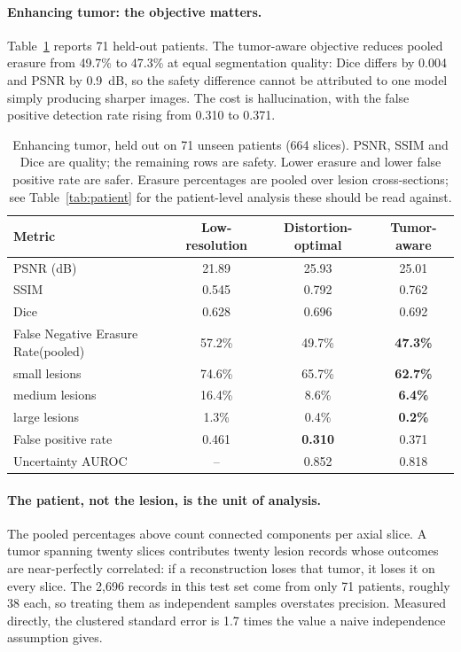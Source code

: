 \documentclass[11pt,a4paper]{article}
\newcommand{\FNER}{False Negative Erasure Rate\xspace}
\begin{document}
\paragraph{Enhancing tumor: the objective matters.}
Table~\ref{tab:main} reports 71 held-out patients. The tumor-aware objective reduces pooled erasure from 49.7\% to 47.3\% at equal segmentation quality: Dice differs by 0.004 and PSNR by 0.9~dB, so the safety difference cannot be attributed to one model simply producing sharper images. The cost is hallucination, with the false positive detection rate rising from 0.310 to 0.371.

\begin{table}[h]
  \caption{Enhancing tumor, held out on 71 unseen patients (664 slices). PSNR, SSIM and Dice are quality; the remaining rows are safety. Lower erasure and lower false positive rate are safer. Erasure percentages are pooled over lesion cross-sections; see Table~\ref{tab:patient} for the patient-level analysis these should be read against.}
  \label{tab:main}
  \centering
  \renewcommand{\arraystretch}{1.15}
  \begin{tabular}{@{}lccc@{}}
    \toprule
    \textbf{Metric} & \textbf{Low-resolution} & \textbf{Distortion-optimal} & \textbf{Tumor-aware} \\
    \midrule
    PSNR (dB)                  & 21.89 & 25.93 & 25.01 \\
    SSIM                       & 0.545 & 0.792 & 0.762 \\
    Dice                       & 0.628 & 0.696 & 0.692 \\
    \FNER (pooled)             & 57.2\% & 49.7\% & \textbf{47.3\%} \\
    \quad small lesions        & 74.6\% & 65.7\% & \textbf{62.7\%} \\
    \quad medium lesions       & 16.4\% & 8.6\%  & \textbf{6.4\%} \\
    \quad large lesions        & 1.3\%  & 0.4\%  & \textbf{0.2\%} \\
    False positive rate        & 0.461 & \textbf{0.310} & 0.371 \\
    Uncertainty AUROC          & --    & 0.852 & 0.818 \\
    \bottomrule
  \end{tabular}
\end{table}

\paragraph{The patient, not the lesion, is the unit of analysis.}
The pooled percentages above count connected components per axial slice. A tumor spanning twenty slices contributes twenty lesion records whose outcomes are near-perfectly correlated: if a reconstruction loses that tumor, it loses it on every slice. The 2,696 records in this test set come from only 71 patients, roughly 38 each, so treating them as independent samples overstates precision. Measured directly, the clustered standard error is 1.7 times the value a naive independence assumption gives.
\end{document}

